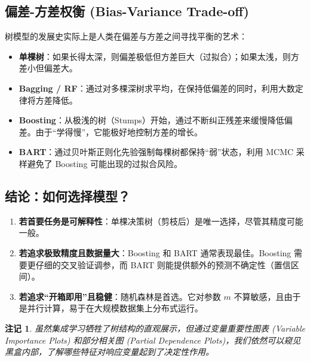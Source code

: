 \documentclass[UTF8]{ctexart}
\newtheorem{remark}{注记}[section]
\numberwithin{equation}{section}
\begin{document}
\subsection{偏差-方差权衡 (Bias-Variance Trade-off)}
树模型的发展史实际上是人类在偏差与方差之间寻找平衡的艺术：
\begin{itemize}
    \item \textbf{单棵树}：如果长得太深，则偏差极低但方差巨大（过拟合）；如果太浅，则方差小但偏差大。
    \item \textbf{Bagging / RF}：通过对多棵深树求平均，在保持低偏差的同时，利用大数定律将方差降低。
    \item \textbf{Boosting}：从极浅的树（Stumps）开始，通过不断纠正残差来缓慢降低偏差。由于“学得慢”，它能极好地控制方差的增长。
    \item \textbf{BART}：通过贝叶斯正则化先验强制每棵树都保持“弱”状态，利用 MCMC 采样避免了 Boosting 可能出现的过拟合风险。
\end{itemize}

\subsection{结论：如何选择模型？}
\begin{enumerate}
    \item \textbf{若首要任务是可解释性}：单棵决策树（剪枝后）是唯一选择，尽管其精度可能一般。
    \item \textbf{若追求极致精度且数据量大}：Boosting 和 BART 通常表现最佳。Boosting 需要更仔细的交叉验证调参，而 BART 则能提供额外的预测不确定性（置信区间）。
    \item \textbf{若追求“开箱即用”且稳健}：随机森林是首选。它对参数 $m$ 不算敏感，且由于是并行计算，易于在大规模数据集上分布式运行。
\end{enumerate}

\begin{remark}
虽然集成学习牺牲了树结构的直观展示，但通过变量重要性图表 (Variable Importance Plots) 和部分相关图 (Partial Dependence Plots)，我们依然可以窥见黑盒内部，了解哪些特征对响应变量起到了决定性作用。
\end{remark}
\end{document}
